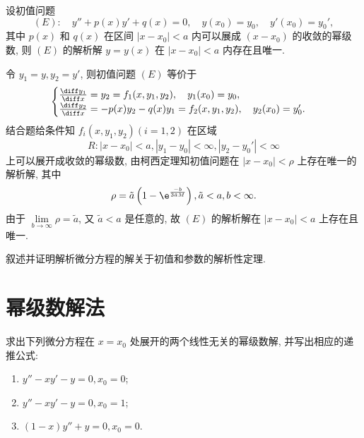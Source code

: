 \begin{exercise}
  设初值问题
  \[(E)\colon\quad y''+p(x)y'+q(x)=0,\quad y(x_0)=y_0,\quad y'(x_0)=y_0',\]
  其中 $p(x)$ 和 $q(x)$ 在区间 $|x-x_0|<a$ 内可以展成 $(x-x_0)$ 的收敛的幂级数, 
  则 $(E)$ 的解析解 $y=y(x)$ 在 $|x-x_0|<a$ 内存在且唯一.
\end{exercise}

\begin{solve} 
  令 $y_1=y,y_2=y'$, 则初值问题 $(E)$ 等价于
  \[\begin{cases}
  \frac{\diff y_1}{\diff x} = y_2 = f_1(x,y_1,y_2),\quad y_1(x_0)=y_0,\\
  \frac{\diff y_2}{\diff x}=-p(x)y_2-q(x)y_1=f_2(x,y_1,y_2),\quad y_2(x_0)=y_0'.
  \end{cases}\]
  结合题给条件知 $f_i(x,y_1,y_2)(i=1,2)$ 在区域 
  \[R:|x-x_0|<a,|y_1-y_0|<\infty,|y_2-y_0'|<\infty\]
  上可以展开成收敛的幂级数, 由柯西定理知初值问题在 $|x-x_0|<\rho$ 上存在唯一的解析解, 其中
  \[\rho=\tilde{a}\left(1-\e^{\frac{-b}{3\tilde{a}M}}\right),\tilde{a}<a,b<\infty.\]
  由于 $\lim\limits_{b\to\infty}\rho=\tilde{a}$, 
  又 $\tilde{a}<a$ 是任意的, 故 $(E)$ 的解析解在 $|x-x_0|<a$ 上存在且唯一.
\end{solve}



\begin{exercise}
  叙述并证明解析微分方程的解关于初值和参数的解析性定理.
\end{exercise}



\section{幂级数解法}



\begin{exercise}
  求出下列微分方程在 $x=x_0$ 处展开的两个线性无关的幂级数解, 并写出相应的递推公式:
  \begin{enumerate}[(1)]
  \item $y''-xy'-y=0,x_0=0$;
  \item $y''-xy'-y=0,x_0=1$;
  \item $(1-x)y''+y=0,x_0=0$.
  \end{enumerate}
\end{exercise}

